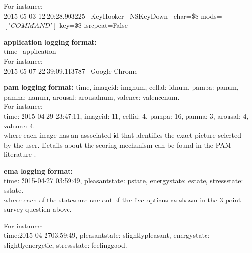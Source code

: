 \documentclass{article}
\begin{document}
 For instance: \\
2015-05-03 12:20:28.903225 
        \textpipe \ KeyHooker               
        \textpipe \ NSKeyDown 
        \textpipe \ char=\$\$ 
        mods=$['COMMAND']$
         key=\$\$ 
         is\textunderscore repeat=False
         
\textbf{application logging format:}\\
time \textpipe \  application  \\

For instance:\\
2015-05-07 22:39:09.113787 \textpipe  \  Google Chrome

\textbf{pam logging format:}
time, 
image\textunderscore id: img\textunderscore num, 
cell\textunderscore id: id\textunderscore num, 
pam\textunderscore pa: pa\textunderscore num, 
pam\textunderscore na: na\textunderscore num, 
arousal: arousal\textunderscore num, 
valence: valence\textunderscore num. \\

For instance: \\
time: 2015-04-29 23:47:11, image\textunderscore id: 11, cell\textunderscore id: 4, pam\textunderscore pa: 16, pam\textunderscore na: 3, arousal: 4, valence: 4. \\
where each image has an associated id that identifies the exact picture selected by the user. Details about the scoring mechanism can be found in the PAM literature \cite{pollak2011pam}.

\textbf{ema logging format:}\\
time: 2015-04-27 03:59:49, pleasant\textunderscore state: p\textunderscore state, energy\textunderscore state: e\textunderscore state, stress\textunderscore state: s\textunderscore state. \\
where each of the states are one out of the five options as shown in the 3-point survey question above. 

For instance: \\
time:2015-04-2703:59:49, pleasant\textunderscore state: slightly\textunderscore pleasant, energy\textunderscore state: slightly\textunderscore energetic, stress\textunderscore state: feeling\textunderscore good.

\end{document}
